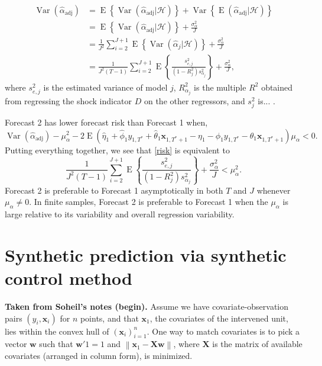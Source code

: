 \documentclass[11pt]{article}
\newcommand{\w}{\textbf{w}}
\newcommand{\x}{\textbf{x}}
\newcommand{\X}{\textbf{X}}
\newcommand{\Hist}{\mathcal{H}}
\newcommand{\norm}[1]{\left\lVert#1\right\rVert}
\DeclareMathOperator{\E}{E}
\DeclareMathOperator{\Var}{Var}
\begin{document}
\begin{align*}
  \Var(\hat{\alpha}_{\text{adj}}) &= \E\left\{\Var(\hat{\alpha}_{\text{adj}}|\Hist)\right\} 
    + \Var\left\{\E(\hat{\alpha}_{\text{adj}}|\Hist)\right\} \\
  &= \E\left\{\Var(\hat{\alpha}_{\text{adj}}|\Hist)\right\} + \frac{\sigma_{\alpha}^2}{J} \\
  &= \frac{1}{J^2} \sum_{i=2}^{J+1} \E\left\{\Var(\hat{\alpha}_j|\Hist)\right\} + \frac{\sigma_{\alpha}^2}{J} \\
  &= \frac{1}{J^2(T-1)}\sum_{i=2}^{J+1} \E\left\{\frac{s_{e,j}^2}{(1-R^2_j)s_{\alpha_j}^2}\right\} 
    + \frac{\sigma_{\alpha}^2}{J},
\end{align*}
where $s_{e,j}^2$ is the estimated variance of model $j$, $R^2_{\alpha_j}$ is 
the multiple $R^2$ obtained from regressing the shock indicator $D$ on the 
other regressors, and $s_j^2$ is... .

Forecast 2 has lower forecast risk than Forecast 1 when,  
\begin{equation} \label{risk}
  \Var(\hat{\alpha}_{\text{adj}}) - \mu_{\alpha}^2 
    - 2\E\left(\hat\eta_1 + \hat\phi_1 y_{1,T^*} + \hat\theta_1 \x_{1,T^*+1} -\eta_1 - \phi_1 y_{1,T^*} 
      - \theta_1 \x_{1,T^*+1}\right)\mu_{\alpha} < 0.
\end{equation}
Putting everything together, we see that \eqref{risk} is equivalent to
$$
  \frac{1}{J^2(T-1)}\sum_{i=2}^{J+1} \E\left\{\frac{s_{e,j}^2}{(1-R^2_j)s_{\alpha_j}^2}\right\} 
    + \frac{\sigma_{\alpha}^2}{J} < \mu_{\alpha}^2.
$$
Forecast 2 is preferable to Forecast 1 asymptotically in both $T$ and $J$ 
whenever $\mu_{\alpha} \neq 0$. In finite samples, Forecast 2 is preferable to 
Forecast 1 when the $\mu_{\alpha}$ is large relative to its variability and 
overall regression variability.  














\section{Synthetic prediction via synthetic control method}


{\bf Taken from Soheil's notes (begin).}
Assume we have covariate-observation pairs $(y_i, \x_i)$ for $n$ points, and 
that $\x_1$, the covariates of the intervened unit, lies within the convex hull 
of $(\x_i)_{i=1}^n$. One way to match covariates is to pick a vector $\w$ such 
that $\w'1=1$ and $\norm{\x_1 - \X\w}$, where $\X$ is the matrix of available 
covariates (arranged in column form), is minimized.
\end{document}
